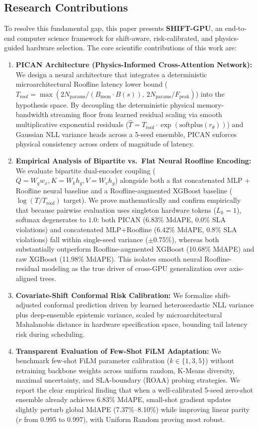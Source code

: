 \documentclass[preprint,12pt]{elsarticle}
\begin{document}
\subsection{Research Contributions}
To resolve this fundamental gap, this paper presents \textbf{SHIFT-GPU}, an end-to-end computer science framework for shift-aware, risk-calibrated, and physics-guided hardware selection. The core scientific contributions of this work are:

\begin{enumerate}
    \item \textbf{PICAN Architecture (Physics-Informed Cross-Attention Network):} We design a neural architecture that integrates a deterministic microarchitectural Roofline latency lower bound ($T_{\text{roof}} = \max(2 N_{\text{params}}/(B_{\text{mem}} \cdot B(s)),\, 2 N_{\text{params}}/F_{\text{peak}})$) into the hypothesis space. By decoupling the deterministic physical memory-bandwidth streaming floor from learned residual scaling via smooth multiplicative exponential residuals ($\hat{T} = T_{\text{roof}} \cdot \exp(\mathrm{softplus}(r_\theta))$) and Gaussian NLL variance heads across a 5-seed ensemble, PICAN enforces physical consistency across orders of magnitude of latency.
    \item \textbf{Empirical Analysis of Bipartite vs.\ Flat Neural Roofline Encoding:} We evaluate bipartite dual-encoder coupling ($Q = W_q w_x, K = W_k h_g, V = W_v h_g$) alongside both a flat concatenated MLP + Roofline neural baseline and a Roofline-augmented XGBoost baseline ($\log(T / T_{\text{roof}})$ target). We prove mathematically and confirm empirically that because pairwise evaluation uses singleton hardware tokens ($L_k = 1$), softmax degenerates to $1.0$: both PICAN (6.83\% MdAPE, 0.0\% SLA violations) and concatenated MLP+Roofline (6.42\% MdAPE, 0.8\% SLA violations) fall within single-seed variance ($\pm 0.75\%$), whereas both substantially outperform Roofline-augmented XGBoost (10.68\% MdAPE) and raw XGBoost (11.98\% MdAPE). This isolates smooth neural Roofline-residual modeling as the true driver of cross-GPU generalization over axis-aligned trees.
    \item \textbf{Covariate-Shift Conformal Risk Calibration:} We formalize shift-adjusted conformal prediction driven by learned heteroscedastic NLL variance plus deep-ensemble epistemic variance, scaled by microarchitectural Mahalanobis distance in hardware specification space, bounding tail latency risk during scheduling.
    \item \textbf{Transparent Evaluation of Few-Shot FiLM Adaptation:} We benchmark few-shot FiLM parameter calibration ($k \in \{1, 3, 5\}$) without retraining backbone weights across uniform random, K-Means diversity, maximal uncertainty, and SLA-boundary (ROAA) probing strategies. We report the clear empirical finding that when a well-calibrated 5-seed zero-shot ensemble already achieves 6.83\% MdAPE, small-shot gradient updates slightly perturb global MdAPE (7.37\%--8.10\%) while improving linear parity ($r$ from 0.995 to 0.997), with Uniform Random proving most robust.

\end{enumerate}
\end{document}
